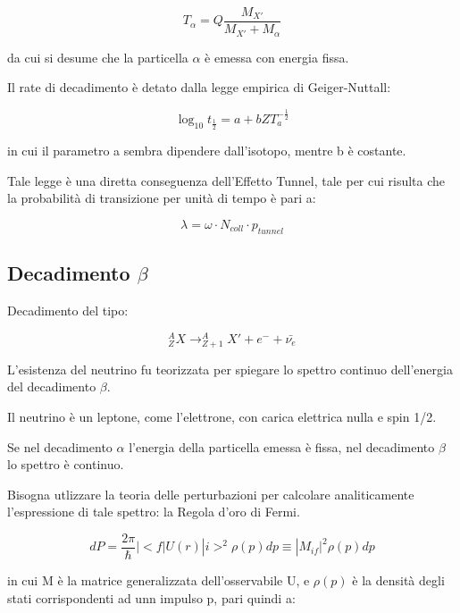 \documentclass{article}
\begin{document}
\begin{equation}
    T_{\alpha}=Q\frac{M_{X'}}{M_{X'}+M_{\alpha}}
\end{equation}

da cui si desume che la particella $\alpha$ è emessa con energia fissa.

Il rate di decadimento è detato dalla legge empirica di Geiger-Nuttall:

\begin{equation}
    \log_{10}{t_{\frac{1}{2}}}=a+bZT_a^{-\frac{1}{2}}
\end{equation}

in cui il parametro a sembra dipendere dall'isotopo, mentre b è costante.

Tale legge è una diretta conseguenza dell'Effetto Tunnel, tale per cui risulta che la probabilità di transizione per unità di tempo
è pari a:

\begin{equation}
    \lambda=\omega \cdot N_{coll}\cdot p_{tunnel}
\end{equation}

\subsection{Decadimento $\beta$}

Decadimento del tipo:

\begin{equation}
    ^A_ZX\rightarrow ^A_{Z+1}X'+e^-+\bar{\nu_e}
\end{equation}

L'esistenza del neutrino fu teorizzata per spiegare lo spettro continuo dell'energia del decadimento $\beta$.

Il neutrino è un leptone, come l'elettrone, con carica elettrica nulla e spin 1/2.

Se nel decadimento $\alpha$ l'energia della particella emessa è fissa, nel decadimento $\beta$ lo spettro è continuo.

Bisogna utlizzare la teoria delle perturbazioni per calcolare analiticamente l'espressione di tale spettro: la Regola d'oro di Fermi.

\begin{equation}
    dP=\frac{2\pi}{\hbar}|<f|U(r)|i>^2\rho(p)dp \equiv |M_{if}|^2\rho(p)dp
\end{equation}

in cui M è la matrice generalizzata dell'osservabile U, e $\rho(p)$ è la densità degli stati corrispondenti ad unn impulso p, pari quindi a:
\end{document}
